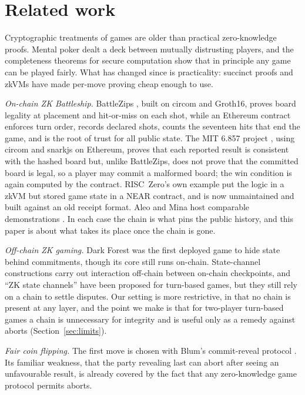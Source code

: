 \documentclass[11pt,a4paper]{article}
\begin{document}
\section{Related work}
\label{sec:related}

Cryptographic treatments of games are older than practical zero-knowledge
proofs. Mental poker \cite{sra81} dealt a deck between mutually distrusting
players, and the completeness theorems for secure computation \cite{gmw87} show
that in principle any game can be played fairly. What has changed since is
practicality: succinct proofs and zkVMs have made per-move proving cheap enough
to use.

\emph{On-chain ZK Battleship.} BattleZips \cite{battlezips}, built on circom
and Groth16, proves board legality at placement and hit-or-miss on each shot,
while an Ethereum contract enforces turn order, records declared shots, counts
the seventeen hits that end the game, and is the root of trust for all public
state. The MIT 6.857 project \cite{mit6857}, using circom and snarkjs on
Ethereum, proves that each reported result is consistent with the hashed board
but, unlike BattleZips, does not prove that the committed board is legal, so a
player may commit a malformed board; the win condition is again computed by the
contract. RISC~Zero's own example \cite{risc0battleship} put the logic in a
zkVM but stored game state in a NEAR contract, and is now unmaintained and
built against an old receipt format. Aleo and Mina host comparable
demonstrations \cite{aleobattleship,minabattleship}. In each case the chain is
what pins the public history, and this paper is about what takes its place once
the chain is gone.

\emph{Off-chain ZK gaming.} Dark Forest \cite{darkforest} was the first
deployed game to hide state behind commitments, though its core still runs
on-chain. State-channel constructions \cite{statechannels,hawk} carry out
interaction off-chain between on-chain checkpoints, and ``ZK state channels''
have been proposed for turn-based games, but they still rely on a chain to
settle disputes. Our setting is more restrictive, in that no chain is present
at any layer, and the point we make is that for two-player turn-based games a
chain is unnecessary for integrity and is useful only as a remedy against
aborts (Section~\ref{sec:limits}).

\emph{Fair coin flipping.} The first move is chosen with Blum's commit-reveal
protocol \cite{blum}. Its familiar weakness, that the party revealing last can
abort after seeing an unfavourable result, is already covered by the fact that
any zero-knowledge game protocol permits aborts.
\end{document}
